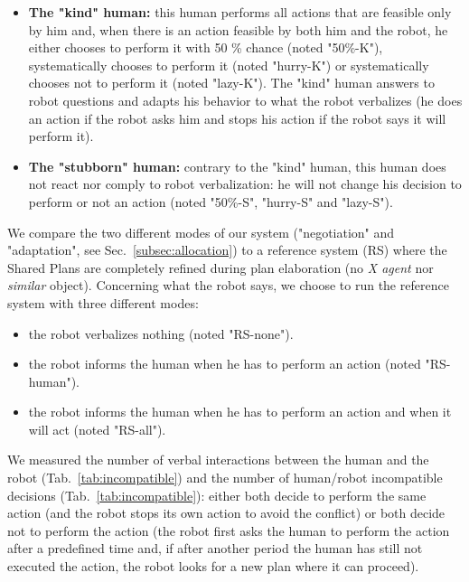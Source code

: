 \documentclass[english,a4paper,11pt,twoside]{StyleThese}
\begin{document}
\begin{itemize}
\item \textbf{The "kind" human:} this human performs all actions that are feasible only by him and, when there is an action feasible by both him and the robot, he either chooses to perform it with 50 \% chance (noted "50\%-K"), systematically chooses to perform it (noted "hurry-K") or systematically chooses not to perform it (noted "lazy-K"). The "kind" human answers to robot questions and adapts his behavior to what the robot verbalizes (he does an action if the robot asks him and stops his action if the robot says it will perform it).
\item \textbf{The "stubborn" human:} contrary to the "kind" human, this human does not react nor comply to robot verbalization: he will not change his decision to perform or not an action (noted "50\%-S", "hurry-S" and "lazy-S").
\end{itemize}

We compare the two different modes of our system ("negotiation" and "adaptation", see Sec.~\ref{subsec:allocation}) to a reference system (RS) where the Shared Plans are completely refined during plan elaboration (no \textit{X agent} nor \textit{similar} object). Concerning what the robot says, we choose to run the reference system with three different modes:
\begin{itemize}
\item the robot verbalizes nothing (noted "RS-none").
\item the robot informs the human when he has to perform an action (noted "RS-human").
\item the robot informs the human when he has to perform an action and when it will act (noted "RS-all").
\end{itemize}

We measured the number of verbal interactions between the human and the robot (Tab.~\ref{tab:incompatible}) and the number of human/robot incompatible decisions (Tab.~\ref{tab:incompatible}): either both decide to perform the same action (and the robot stops its own action to avoid the conflict) or both decide not to perform the action (the robot first asks the human to perform the action after a predefined time and, if after another period the human has still not executed the action, the robot looks for a new plan where it can proceed).
\end{document}
